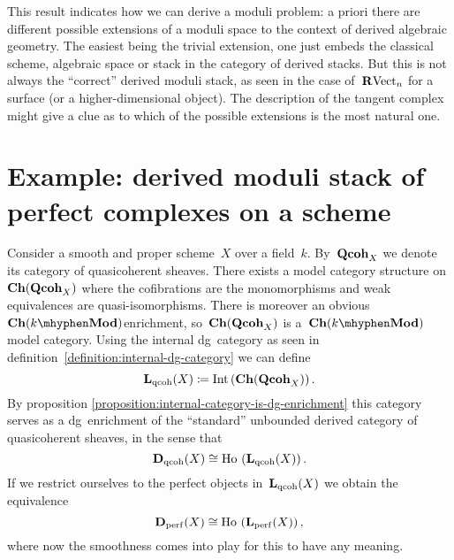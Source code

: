 \begin{refsection}
\begin{remark}
  This result indicates how we can derive a moduli problem: a priori there are different possible extensions of a moduli space to the context of derived algebraic geometry. The easiest being the trivial extension, one just embeds the classical scheme, algebraic space or stack in the category of derived stacks. But this is not always the ``correct'' derived moduli stack, as seen in the case of~$\mathbf{R}\mathrm{Vect}_n$ for a surface (or a higher-dimensional object). The description of the tangent complex might give a clue as to which of the possible extensions is the most natural one.
\end{remark}


\section{Example: derived moduli stack of perfect complexes on a scheme}
\label{section:example}
Consider a smooth and proper scheme~$X$ over a field~$k$. By~$\mathbf{Qcoh}_X$ we denote its category of quasicoherent sheaves. There exists a model category structure on~$\mathbf{Ch}(\mathbf{Qcoh}_X)$ where the cofibrations are the monomorphisms and weak equivalences are quasi-isomorphisms. There is moreover an obvious~$\Ch(k\mhyphen\Mod)$\dash enrichment, so~$\mathbf{Ch}(\mathbf{Qcoh}_X)$ is a~$\Ch(k\mhyphen\Mod)$\dash model category. Using the internal dg~category as seen in definition~\ref{definition:internal-dg-category} we can define
\begin{equation}
  \mathbf{L}_{\mathrm{qcoh}}(X)\coloneqq\operatorname{Int}\left( \mathbf{Ch}(\mathbf{Qcoh}_X) \right).
\end{equation}
By proposition \ref{proposition:internal-category-is-dg-enrichment} this category serves as a dg~enrichment of the ``standard'' unbounded derived category of quasicoherent sheaves, in the sense that
\begin{equation}
  \mathbf{D}_{\mathrm{qcoh}}(X)\cong\operatorname{\mathrm{Ho} \,}\left( \mathbf{L}_{\mathrm{qcoh}}(X) \right).
\end{equation}
If we restrict ourselves to the perfect objects in~$\mathbf{L}_{\mathrm{qcoh}}(X)$ we obtain the equivalence
\begin{equation}
  \mathbf{D}_{\mathrm{perf}}(X)\cong\operatorname{\mathrm{Ho} \,}\left( \mathbf{L}_{\mathrm{perf}}(X) \right),
\end{equation}
where now the smoothness comes into play for this to have any meaning.


\end{refsection}

